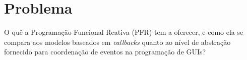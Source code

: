 \section{Problema}
\label{sec:problema}

O quê a Programação Funcional Reativa (PFR) tem a oferecer, e como ela se
compara aos modelos baseados em \emph{callbacks} quanto ao nível de abstração
fornecido para coordenação de eventos na programação de GUIs?

%
%
%

